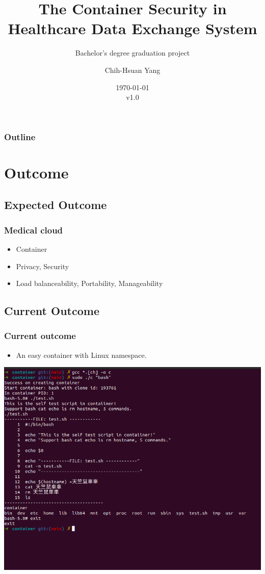 \documentclass{beamer}
\title{The Container Security in Healthcare Data Exchange System}
\subtitle{Bachelor's degree graduation project}
\author{Chih-Hsuan Yang}
\institute{National Sun Yat-sen University}
\date{\today\\v1.0}
\begin{document}
\begin{frame}
    \titlepage
\end{frame}

\begin{frame}
    \frametitle{Outline}
    \tableofcontents
\end{frame}

\section{Outcome}
\subsection{Expected Outcome}
\begin{frame}
    \frametitle{Medical cloud}
    \begin{itemize}
        \item Container
        \item Privacy, Security
        \item Load balanceability, Portability, Manageability
    \end{itemize}
\end{frame}

\subsection{Current Outcome}
\begin{frame}
    \frametitle{Current outcome}
    \begin{itemize}
        \item An easy container with Linux namespace.
    \end{itemize}
    \centering\includegraphics[width=1.0\textwidth]{cur_cont.png}
\end{frame}
\end{document}
